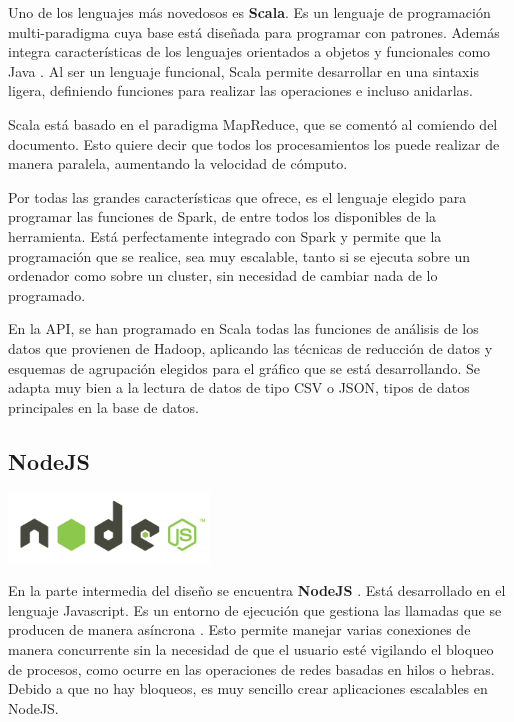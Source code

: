 Uno de los lenguajes más novedosos es \textbf{Scala}. Es un lenguaje de programación multi-paradigma cuya base está diseñada para programar con patrones. Además integra características de los lenguajes orientados a objetos y funcionales como Java \cite{ScalaInicial}. Al ser un lenguaje funcional, Scala permite desarrollar en una sintaxis ligera, definiendo funciones para realizar las operaciones e incluso anidarlas. 

Scala está basado en el paradigma MapReduce, que se comentó al comiendo del documento. Esto quiere decir que todos los procesamientos los puede realizar de manera paralela, aumentando la velocidad de cómputo.

Por todas las grandes características que ofrece, es el lenguaje elegido para programar las funciones de Spark, de entre todos los disponibles de la herramienta. Está perfectamente integrado con Spark y permite que la programación que se realice, sea muy escalable, tanto si se ejecuta sobre un ordenador como sobre un cluster, sin necesidad de cambiar nada de lo programado. 

En la API, se han programado en Scala todas las funciones de análisis de los datos que provienen de Hadoop, aplicando las técnicas de reducción de datos y esquemas de agrupación elegidos para el gráfico que se está desarrollando. Se adapta muy bien a la lectura de datos de tipo CSV o JSON, tipos de datos principales en la base de datos. 


\subsection{NodeJS}
\begin{minipage}{\textwidth}
	\centering
	\includegraphics[width=0.4\textwidth]{imagenes/nodejs_logo.png}\\[0.1cm]
\end{minipage}

En la parte intermedia del diseño se encuentra \textbf{NodeJS} \cite{NodeJSInicial}. Está desarrollado en el lenguaje Javascript. Es un entorno de ejecución que gestiona las llamadas que se producen de manera asíncrona \cite{NodeJSAbout}. Esto permite manejar varias conexiones de manera concurrente sin la necesidad de que el usuario esté vigilando el bloqueo de procesos, como ocurre en las operaciones de redes basadas en hilos o hebras. Debido a que no hay bloqueos, es muy sencillo crear aplicaciones escalables en NodeJS.


